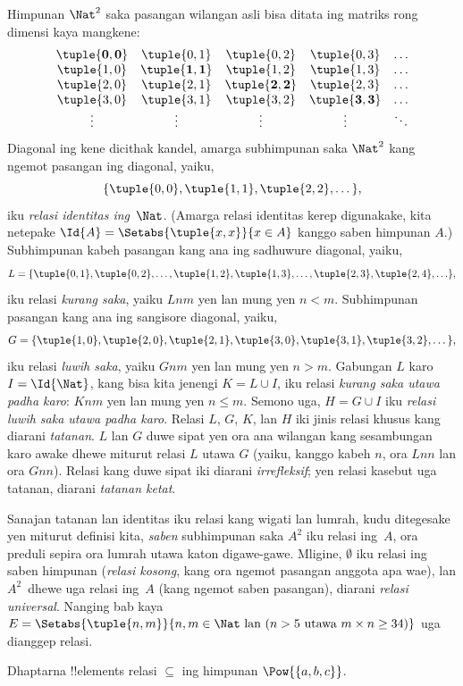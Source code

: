 \documentclass[../../../include/open-logic-section]{subfiles}
\begin{document}
\begin{ex}
Himpunan $\Nat^{2}$ saka pasangan wilangan asli bisa
ditata ing matriks rong dimensi kaya mangkene:
\[
  \begin{array}{ccccc}
  \mathbf{\tuple{ 0,0 }} & \tuple{ 0,1 } &
    \tuple{ 0,2 } & \tuple{ 0,3 } & \ldots\\
  \tuple{ 1,0 } & \mathbf{\tuple{ 1,1 }} &
    \tuple{ 1,2 } & \tuple{ 1,3 } & \ldots\\
  \tuple{ 2,0 } & \tuple{ 2,1 } &
    \mathbf{\tuple{ 2,2 }} & \tuple{ 2,3 } & \ldots\\
  \tuple{ 3,0 } & \tuple{ 3,1 } & \tuple{ 3,2 } &
    \mathbf{\tuple{ 3,3 }} & \ldots\\
  \vdots & \vdots & \vdots & \vdots & \mathbf{\ddots}
  \end{array}
\]
Diagonal ing kene dicithak kandel, amarga subhimpunan saka
$\Nat^2$ kang ngemot pasangan ing diagonal, yaiku,
\[
  \{\tuple{0,0 }, \tuple{ 1,1 }, \tuple{ 2,2 }, \dots\},
  \]
iku \emph{relasi identitas ing}~$\Nat$.
(Amarga relasi identitas kerep digunakake, kita netepake
$\Id{A}=\Setabs{\tuple{ x,x }}{x \in A}$ kanggo saben himpunan $A$.)
Subhimpunan kabeh pasangan kang ana ing sadhuwure diagonal, yaiku,
\[
  L = \{\tuple{ 0,1 },\tuple{ 0,2 },\ldots,\tuple{ 1,2 },
  \tuple{ 1,3 }, \dots, \tuple{ 2,3 }, \tuple{ 2,4 },\ldots\},
\]
iku relasi \emph{kurang saka}, yaiku $Lnm$ yen lan mung yen $n<m$.
Subhimpunan pasangan kang ana ing sangisore diagonal, yaiku,
\[
  G=\{ \tuple{ 1,0 },\tuple{ 2,0 },\tuple{
    2,1 }, \tuple{ 3,0 },\tuple{ 3,1 },\tuple{ 3,2 }, \dots\},
\]
iku relasi \emph{luwih saka}, yaiku $Gnm$ yen lan mung yen $n>m$.
Gabungan $L$ karo $I=\Id{\Nat}$, kang bisa kita jenengi $K=L\cup I$,
iku relasi \emph{kurang saka utawa padha karo}:
$Knm$ yen lan mung yen $n \le m$.
Semono uga, $H=G \cup I$ iku \emph{relasi luwih saka
utawa padha karo}. Relasi $L$, $G$, $K$, lan $H$ iki
jinis relasi khusus kang diarani \emph{tatanan}.
$L$ lan $G$ duwe sipat yen ora ana wilangan kang sesambungan
karo awake dhewe miturut relasi $L$ utawa $G$
(yaiku, kanggo kabeh $n$, ora $Lnn$ lan ora $Gnn$).
Relasi kang duwe sipat iki diarani \emph{irrefleksif};
yen relasi kasebut uga tatanan, diarani \emph{tatanan ketat}.
\end{ex}

\begin{explain}
Sanajan tatanan lan identitas iku relasi kang wigati lan lumrah,
kudu ditegesake yen miturut definisi kita, \emph{saben}
subhimpunan saka $A^{2}$ iku relasi ing~$A$,
ora preduli sepira ora lumrah utawa katon digawe-gawe.
Mligine, $\emptyset$ iku relasi ing saben himpunan
(\emph{relasi kosong}, kang ora ngemot pasangan anggota apa wae),
lan $A^{2}$~dhewe uga relasi ing~$A$
(kang ngemot saben pasangan), diarani \emph{relasi universal}.
Nanging bab kaya
$E=\Setabs{\tuple{n, m}}{n,m\in\Nat \text{ lan }(n>5 \text{ utawa } m \times n \ge 34)}$
uga dianggep relasi.
\end{explain}

\begin{prob}
  Dhaptarna !!{element}s relasi $\subseteq$ ing himpunan
  $\Pow{\{a, b, c\}}$.
\end{prob}
\end{document}
